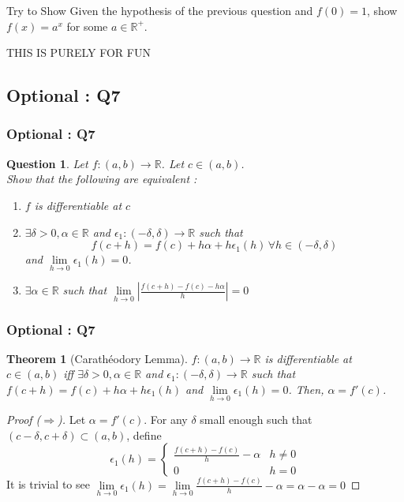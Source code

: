 \documentclass[handout,aspectratio=169]{beamer}
\newtheorem{thm}{Theorem}
\newtheorem{qsn}{Question}
\newcommand{\bR}{\mathbb{R}}
\begin{document}
\begin{frame}
\begin{block}{Try to Show}
Given the hypothesis of the previous question and $f(0)=1$, show $f(x) = a^x$ for some $a\in\bR^+$.
\end{block} \pause
THIS IS PURELY FOR FUN
\end{frame}

\subsection{Optional : Q7}

\begin{frame}
\frametitle{Optional : Q7}
\pause
\begin{qsn}
Let $f : (a,b) \to \bR$. Let $c\in (a,b)$.\\
Show that the following are equivalent :
\begin{enumerate}
\item $f$ is differentiable at $c$
\item $\exists \delta>0, \alpha \in \bR$ and $\epsilon_1 : (-\delta,\delta) \to \bR$ such that
$$f(c+h) = f(c) + h\alpha + h\epsilon_1(h) \,\forall h \in (-\delta,\delta)$$
and $\lim\limits_{h\to 0} \epsilon_1(h) = 0$.
\item $\exists \alpha \in \bR$ such that $\lim\limits_{h\to 0} \left| \frac{f(c+h)-f(c)-h\alpha}{h} \right| = 0$
\end{enumerate}
\end{qsn}
\end{frame}

\begin{frame}
\frametitle{Optional : Q7}
\begin{thm}[Carath\'eodory Lemma]
$f:(a,b) \to \bR$ is differentiable at $c\in (a,b)$ iff $\exists \delta>0, \alpha \in \bR$ and $\epsilon_1 : (-\delta,\delta) \to \bR$ such that $f(c+h) = f(c) + h\alpha + h\epsilon_1(h)$ and $\lim\limits_{h\to 0} \epsilon_1(h) = 0$. Then, $\alpha = f'(c)$.
\end{thm}
\pause
\begin{proof}[Proof ($\Rightarrow$)]
Let $\alpha = f'(c)$. For any $\delta$ small enough such that $(c-\delta,c+\delta) \subset (a,b)$, define \pause
$$\epsilon_1 (h) = 
\begin{cases}
\frac{f(c+h) - f(c)}{h} - \alpha & h\neq 0\\
0 & h=0
\end{cases}
$$\pause
It is trivial to see $\lim\limits_{h\to 0} \epsilon_1(h) = \lim\limits_{h\to 0} \frac{f(c+h)-f(c)}{h} - \alpha = \alpha-\alpha = 0$
\end{proof}
\end{frame}
\end{document}
